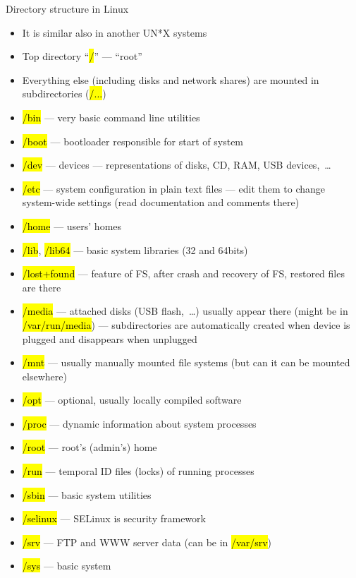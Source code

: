 \documentclass[compress, ucs, xelatex, 11pt, xcolor=svgnames,
  hyperref={
    bookmarks=true,
    unicode=true,
    colorlinks=true,
    pdftitle={Linux, command line and MetaCentrum},
    plainpages=false,
    pdfauthor={Vojtech Zeisek},
    pdfsubject={Course about use of Linux command line, writing shell scripts and using MetaCentrum of CESNET},
    pdfcreator={XeLaTeX},
    pdfkeywords={Linux, GNU, BASH, shell, command line, MetaCentrum},
    linkcolor=DarkRed,
    anchorcolor=DarkBlue,
    citecolor=Indigo,
    filecolor=NavyBlue,
    menucolor=DarkMagenta,
    urlcolor=DarkBlue,
    pdftex},
  url={hyphens, lowtilde} %
  ]{beamer}
\renewcommand{\texttt}[1]{\hl{\ttfamily #1}}
\renewcommand{\alert}[1]{\textcolor{red}{#1}}
\begin{document}
\begin{frame}[allowframebreaks]{Directory structure in Linux}
  \begin{itemize}
    \item It is similar also in another UN*X systems
    \item Top directory ``\texttt{/}'' --- ``root''
    \item Everything else (including disks and network shares) are mounted in subdirectories (\texttt{/...})
    \item \texttt{/bin} --- very basic command line utilities
    \item \texttt{/boot} --- bootloader responsible for start of system
    \item \texttt{/dev} --- devices --- representations of disks, CD, RAM, USB devices,~\ldots
    \item \alert{\texttt{/etc}} --- system configuration in plain text files --- edit them to change system-wide settings (read documentation and comments there)
    \item \alert{\texttt{/home}} --- users' homes
    \item \texttt{/lib}, \texttt{/lib64} --- basic system libraries (32 and 64bits)
    \item \texttt{/lost+found} --- feature of FS, after crash and recovery of FS, restored files are there
    \item \alert{\texttt{/media}} --- attached disks (USB flash,~\ldots) usually appear there (might be in \texttt{/var/run/media}) --- subdirectories are automatically created when device is plugged and disappears when unplugged
    \item \texttt{/mnt} --- usually manually mounted file systems (but can it can be mounted elsewhere)
    \item \texttt{/opt} --- optional, usually locally compiled software
    \item \texttt{/proc} --- dynamic information about system processes
    \item \texttt{/root} --- root's (admin's) home
    \item \texttt{/run} --- temporal ID files (locks) of running processes
    \item \texttt{/sbin} --- basic system utilities
    \item \texttt{/selinux} --- SELinux is security framework
    \item \texttt{/srv} --- FTP and WWW server data (can be in \texttt{/var/srv})
    \item \texttt{/sys} --- basic system

\end{itemize}
\end{frame}
\end{document}
